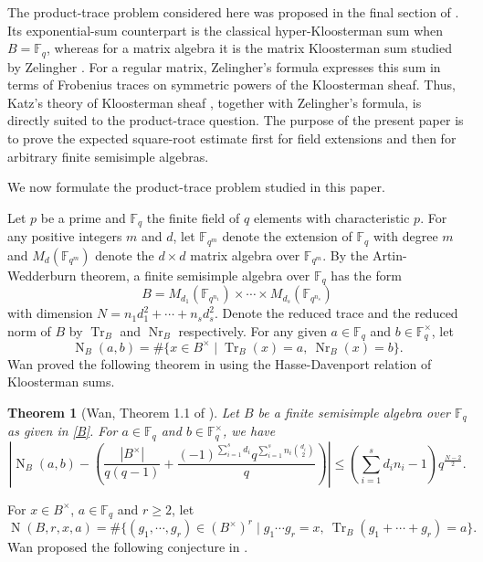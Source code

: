 \documentclass[11pt]{amsart}
\newtheorem{theorem}{Theorem}[section]
\theoremstyle{remark}
\newcommand{\F}{\mathbb F}
\newcommand{\Tr}{\operatorname{Tr}}
\newcommand{\Nr}{\operatorname{Nr}}
\newcommand{\Nm}{\operatorname{N}}
\begin{document}
The product-trace problem considered here was proposed in the final section of \cite{WanNormTrace}. Its exponential-sum counterpart is the classical
hyper-Kloosterman sum when $B=\F_q$, whereas for a matrix algebra it is the matrix Kloosterman sum studied by Zelingher \cite{ZelingherMatrix}. For a
regular matrix, Zelingher's formula expresses this sum in terms of Frobenius traces on symmetric powers of the Kloosterman sheaf. Thus, Katz's theory of
Kloosterman sheaf \cite{KatzGKM}, together with Zelingher's formula, is
directly suited to the product-trace question. The purpose of the present paper is to prove the expected square-root estimate first for field extensions and then for arbitrary finite semisimple algebras.

We now formulate the product-trace problem studied in this paper. 

Let $p$ be a prime and $\F_q$ the finite field of $q$ elements with characteristic $p$. For any positive integers $m$ and $d$, let $\F_{q^m}$ denote the extension of $\F_q$ with degree $m$ and $M_{d}(\F_{q^m})$ denote the $d\times d$ matrix algebra over $\F_{q^m}$. By the Artin-Wedderburn theorem, a  finite semisimple algebra over $\F_q$ has the form
\begin{equation}\label{B}
B = M_{d_1}(\F_{q^{n_1}}) \times \cdots \times M_{d_s}(\F_{q^{n_s}})
\end{equation}
with dimension $N=n_1 d_{1}^2+\cdots + n_s d_{s}^2$. 
Denote the reduced trace and the reduced norm of $B$ by $\Tr_B$ and $\Nr_B$ respectively. For any given $a\in \F_q$ and $b\in \F_q^{\times}$, let
\[
\Nm_B(a, b)= \# \{ x \in B^{\times} \mid \Tr_B(x)=a,~\Nr_B(x)=b\}.
\]
Wan proved the following theorem in \cite{WanNormTrace} using the Hasse-Davenport relation of Kloosterman sums. 

\begin{theorem}[Wan, Theorem 1.1 of \cite{WanNormTrace} ]\label{wanthm}
Let $B$ be a finite semisimple algebra over $\F_q$ as given in \eqref{B}. For $a \in \F_q$ and $b\in\F_q^{\times}$, we have
\[
\left|\Nm_B (a, b) - \left( \frac{|B^{\times}|}{q(q-1)} + \frac{(-1)^{\sum_{i=1}^s d_i}q^{\sum_{i=1}^s n_i \binom{d_i}{2}}}{q} \right) \right| \le\left(\sum_{i=1}^s d_i n_i -1\right)q^{\frac{N-2}{2}}.
\]       
\end{theorem}

For $x \in B^{\times}$, $a \in \F_q$ and $r\ge 2$, let 
\begin{equation}\label{nbrxa}
\Nm(B,r,x,a) = \#\{ (g_1,\cdots, g_r) \in (B^{\times})^r \mid g_1\cdots g_r = x,~\Tr_B(g_1+\cdots +g_r) =a\}.
\end{equation}
Wan proposed the following conjecture in \cite{WanNormTrace}. 
\end{document}
